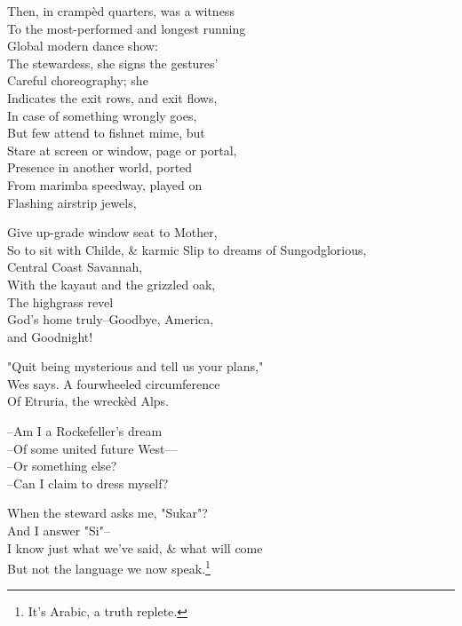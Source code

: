 Then, in crampèd quarters, was a witness \\
To the most-performed and longest running \\
Global modern dance show: \\
The stewardess, she signs the gestures' \\
Careful choreography; she \\
Indicates the exit rows, and exit flows, \\
In case of something wrongly goes, \\
But few attend to fishnet mime, but \\
Stare at screen or window, page or portal, \\
Presence in another world, ported \\
From marimba speedway, played on \\
Flashing airstrip jewels,


Give up-grade window seat to Mother, \\
So to sit with Childe, \& karmic
Slip to dreams of Sungodglorious, \\
Central Coast Savannah, \\
With the kayaut and the grizzled oak, \\
The highgrass revel \\
God's home truly--Goodbye, America, \\
and Goodnight!

"Quit being mysterious and tell us your plans," \\
Wes says. A fourwheeled circumference \\
Of Etruria, the wreckèd Alps.

--Am I a Rockefeller's dream \\
--Of some united future West— \\
--Or something else? \\
--Can I claim to dress myself?

When the steward asks me, "Sukar"? \\
And I answer "Si"-- \\
I know just what we've said, \& what will come \\
But not the language we now speak.\footnote{It's Arabic, a truth replete.}